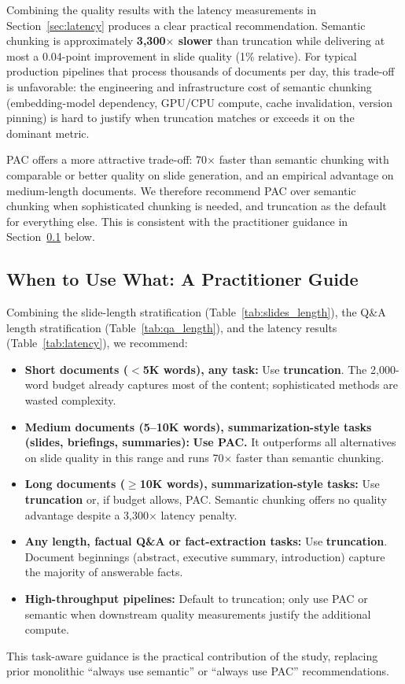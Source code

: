 \documentclass[journal]{IEEEtran}
\begin{document}
Combining the quality results with the latency measurements in Section~\ref{sec:latency} produces a clear practical recommendation. Semantic chunking is approximately \textbf{3{,}300$\times$ slower} than truncation while delivering at most a 0.04-point improvement in slide quality (1\% relative). For typical production pipelines that process thousands of documents per day, this trade-off is unfavorable: the engineering and infrastructure cost of semantic chunking (embedding-model dependency, GPU/CPU compute, cache invalidation, version pinning) is hard to justify when truncation matches or exceeds it on the dominant metric.

PAC offers a more attractive trade-off: 70$\times$ faster than semantic chunking with comparable or better quality on slide generation, and an empirical advantage on medium-length documents. We therefore recommend PAC over semantic chunking when sophisticated chunking is needed, and truncation as the default for everything else. This is consistent with the practitioner guidance in Section~\ref{sec:guide} below.

\subsection{When to Use What: A Practitioner Guide}
\label{sec:guide}

Combining the slide-length stratification (Table~\ref{tab:slides_length}), the Q\&A length stratification (Table~\ref{tab:qa_length}), and the latency results (Table~\ref{tab:latency}), we recommend:
\begin{itemize}
    \item \textbf{Short documents ($<$5K words), any task:} Use \textbf{truncation}. The 2{,}000-word budget already captures most of the content; sophisticated methods are wasted complexity.
    \item \textbf{Medium documents (5--10K words), summarization-style tasks (slides, briefings, summaries):} \textbf{Use PAC.} It outperforms all alternatives on slide quality in this range and runs 70$\times$ faster than semantic chunking.
    \item \textbf{Long documents ($\geq$10K words), summarization-style tasks:} Use \textbf{truncation} or, if budget allows, PAC. Semantic chunking offers no quality advantage despite a 3{,}300$\times$ latency penalty.
    \item \textbf{Any length, factual Q\&A or fact-extraction tasks:} Use \textbf{truncation}. Document beginnings (abstract, executive summary, introduction) capture the majority of answerable facts.
    \item \textbf{High-throughput pipelines:} Default to truncation; only use PAC or semantic when downstream quality measurements justify the additional compute.
\end{itemize}
This task-aware guidance is the practical contribution of the study, replacing prior monolithic ``always use semantic'' or ``always use PAC'' recommendations.
\end{document}
